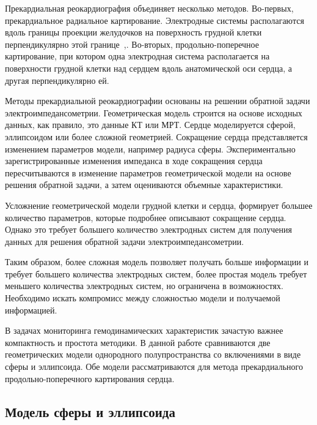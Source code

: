 \documentclass[conference]{IEEEtran}
\begin{document}
Прекардиальная реокардиография объединяет несколько методов.
Во-первых, прекардиальное радиальное картирование.
Электродные системы располагаются вдоль границы проекции желудочков на поверхность грудной клетки перпендикулярно этой границе~\cite{Timokhin2014},\cite{Tikhomirov2019}.
Во-вторых, продольно-поперечное картирование, при котором одна электродная система располагается на поверхности грудной клетки над сердцем вдоль анатомической оси сердца, а другая перпендикулярно ей.

Методы прекардиальной реокардиографии основаны на решении обратной задачи электроимпедансометрии.
Геометрическая модель строится на основе исходных данных, как правило, это данные КТ или МРТ.
Сердце моделируется сферой, эллипсоидом или более сложной геометрией.
Сокращение сердца представляется изменением параметров модели, например радиуса сферы.
Экспериментально зарегистрированные изменения импеданса в ходе сокращения сердца пересчитываются в изменение параметров геометрической модели на основе решения обратной задачи, а затем оцениваются объемные характеристики.

Усложнение геометрической модели грудной клетки и сердца, формирует большее количество параметров, которые подробнее описывают сокращение сердца.
Однако это требует большего количество электродных систем для получения данных для решения обратной задачи электроимпедансометрии.

Таким образом, более сложная модель позволяет получать больше информации и требует большего количества электродных систем, более простая модель требует меньшего количества электродных систем, но ограничена в возможностях.
Необходимо искать компромисс между сложностью модели и получаемой информацией.

В задачах мониторинга гемодинамических характеристик зачастую важнее компактность и простота методики.
В данной работе сравниваются две геометрических модели однородного полупространства со включениями в виде сферы и эллипсоида.
Обе модели рассматриваются для метода прекардиального продольно-поперечного картирования сердца.

\subsection{Модель сферы и эллипсоида}

\end{document}
